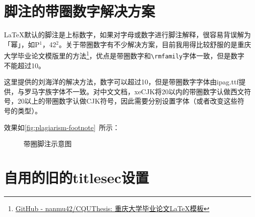\section{脚注的带圈数字解决方案}


\LaTeX{}默认的脚注是上标数字，如果对字母或数字进行脚注解释，很容易背误解为「幂」，如P$ ^1 $，42$ ^2 $。关于带圈数字有不少解决方案，目前我用得比较舒服的是重庆大学毕业论文模版里的方法\footnote{\href{https://github.com/nanmu42/CQUThesis}{GitHub - nanmu42/CQUThesis: 重庆大学毕业论文LaTeX模板}}，优点是带圈数字和\lstinline|\rmfamily|字体一致，但是数字不能超过10。

这里提供的刘海洋的解决方法，数字可以超过10，但是带圈数字字体由ipag.ttf提供，与罗马字族字体不一致。对中文文档，xeCJK将20以内的带圈数字认做西文符号，20以上的带圈数字认做CJK符号，因此需要分别设置字体（或者改变这些符号的类型）。

\begin{latex}
\usepackage{xunicode-addon}
\newfontfamily{} %
\newCJKfontfamily{} %
\renewcommand\thefootnote{{\fnmarkfont\fnCJKmarkfont\textcircled{\arabic{footnote}}}}
\end{latex}

效果如\autoref{fig:plagiarism-footnote}~所示：

\begin{figure}[!htbp]
    \centering
    \caption{带圈脚注示意图}
    \label{fig:plagiarism-footnote}
\end{figure}

\section{自用的旧的titlesec设置}


